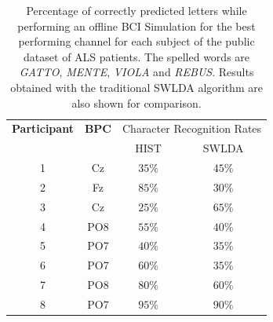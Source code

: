 \documentclass[utf8]{frontiersSCNS} %
\begin{document}
\begin{table}[htb]
\caption{Percentage of correctly predicted letters while performing an offline BCI Simulation for the best performing channel for each subject of the public dataset of ALS patients. The spelled words are \textit{GATTO}, \textit{MENTE}, \textit{VIOLA} and \textit{REBUS}. Results obtained with the traditional SWLDA algorithm are also shown for comparison.}
\centering
\begin{tabular}{cccc}
\toprule
\textbf{Participant}	&  \textbf{BPC}	& \multicolumn{2}{c}{Character Recognition Rates}\\
	&  	&  HIST & SWLDA  \\
\midrule
1     &     Cz   &   $35\%$  & $45\%$  \\
2     &     Fz   &   $85\%$  & $30\%$    \\
3     &     Cz   &   $25\%$  & $65\%$  \\
4     &     PO8 &   $55\%$ & $40\%$   \\
5     &     PO7 &   $40\%$ & $35\%$   \\
6     &     PO7 &   $60\%$ &  $35\%$   \\
7     &     PO8 &   $80\%$ & $60\%$    \\
8     &     PO7 &   $95\%$  & $90\%$   \\

\end{tabular}
\label{tab:results}
\end{table}
\end{document}
